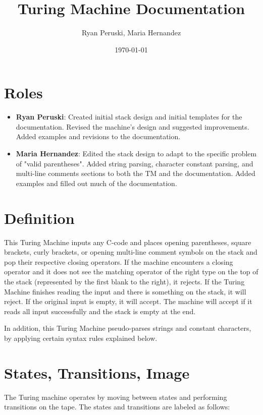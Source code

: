 \documentclass{article}
\title{Turing Machine Documentation}
\author{Ryan Peruski, Maria Hernandez}
\date{\today}
\begin{document}
\maketitle
\section{Roles}

\begin{itemize}
    \item \textbf{Ryan Peruski}: Created initial stack design and initial templates for the documentation. Revised the machine's design and suggested improvements. Added examples and revisions to the documentation.
    \item \textbf{Maria Hernandez}: Edited the stack design to adapt to the specific problem of "valid parentheses". Added string parsing, character constant parsing, and multi-line comments sections
    to both the TM and the documentation. Added examples and filled out much of the documentation.
\end{itemize}

\section{Definition}
This Turing Machine inputs any C-code and places opening parentheses, square brackets, curly brackets, or opening multi-line comment symbols on the stack and pop their respective closing operators. If the machine encounters a closing operator and 
it does not see the matching operator of the right type on the top of the stack (represented by the first blank to the right), 
it rejects. If the Turing Machine finishes reading the input and there is something on the stack, it will reject. 
If the original input is empty, it will accept. The machine will accept if it reads all input successfully and the stack is empty at the end.

In addition, this Turing Machine pseudo-parses strings and constant characters, by applying certain syntax rules explained below. 

\section{States, Transitions, Image}
The Turing machine operates by moving between states and performing transitions on the tape. The states and transitions are labeled as follows:
\end{document}
